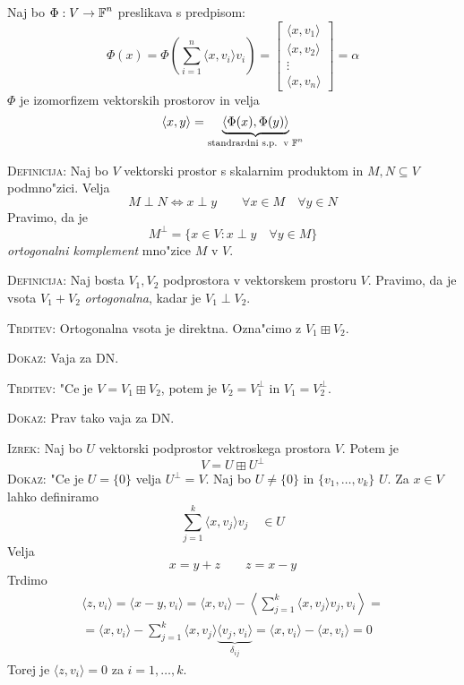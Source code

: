 Naj bo $\Phi: V \to \operatorname{\mathbb{F}}^n$ preslikava s predpisom:
\begin{equation*}
\Phi(x) = \Phi \left( \sum_{i=1}^n \langle x, v_i \rangle v_i \right) = \begin{bmatrix}
\langle x, v_1 \rangle \\
\langle x, v_2 \rangle \\
\vdots \\
\langle x, v_n \rangle
\end{bmatrix} = \alpha
\end{equation*}
$\Phi$ je izomorfizem vektorskih prostorov in velja
\begin{equation*}
\langle x, y \rangle = \underbrace{\langle \Phi(x), \Phi(y) \rangle}_\text{standrardni s.p.\, v $\operatorname{\mathbb{F}}^n$}
\end{equation*}

\textsc{Definicija:} Naj bo $V$ vektorski prostor s skalarnim produktom in $M, N \subseteq V$ podmno"zici. Velja
\begin{equation*}
M \perp N \iff x \perp y \qquad \forall x \in M \quad \forall y \in N
\end{equation*}
Pravimo, da je
\begin{equation*}
M^\perp = \{ x \in V: x \perp y \quad \forall y \in M \}
\end{equation*}
\emph{ortogonalni komplement} mno"zice $M$ v $V$.

\textsc{Definicija:} Naj bosta $V_1, V_2$ podprostora v vektorskem prostoru $V$. Pravimo, da je vsota $V_1 + V_2$ \emph{ortogonalna}, kadar je $V_1 \perp V_2$.

\textsc{Trditev:} Ortogonalna vsota je direktna. Ozna"cimo z $V_1 \boxplus V_2$.

\textsc{Dokaz:} Vaja za DN.

\textsc{Trditev:} "Ce je $V = V_1 \boxplus V_2$, potem je $V_2 = V_1^\perp$ in $V_1 = V_2^\perp$.

\textsc{Dokaz:} Prav tako vaja za DN.

\textsc{Izrek:} Naj bo $U$ vektorski podprostor vektroskega prostora $V$. Potem je
\begin{equation*}
V = U \boxplus U^\perp
\end{equation*}
\textsc{Dokaz:} "Ce je $U = \{ 0 \}$ velja $U^\perp = V$. Naj bo $U \neq \{ 0 \}$ in $\{ v_1, \ldots, v_k \}$ \ONB $U$. Za $x \in V$ lahko definiramo
\begin{equation*}
\sum_{j=1}^k \langle x, v_j \rangle v_j \quad \in U
\end{equation*}
Velja 
\begin{equation*}
x = y + z \qquad z = x - y
\end{equation*}
Trdimo 
\begin{multline*}
\langle z, v_i \rangle = \langle x - y, v_i \rangle = \langle x, v_i \rangle - \left\langle \sum_{j=1}^k \langle x, v_j \rangle v_j, v_i \right\rangle = \\
= \langle x, v_i \rangle - \sum_{j=1}^k \langle x, v_j \rangle \underbrace{\langle v_j, v_i \rangle}_{\delta_{ij}} = \langle x, v_i \rangle - \langle x, v_i \rangle = 0
\end{multline*}
Torej je $\langle z, v_i \rangle = 0$ za $i = 1, \ldots, k$.


